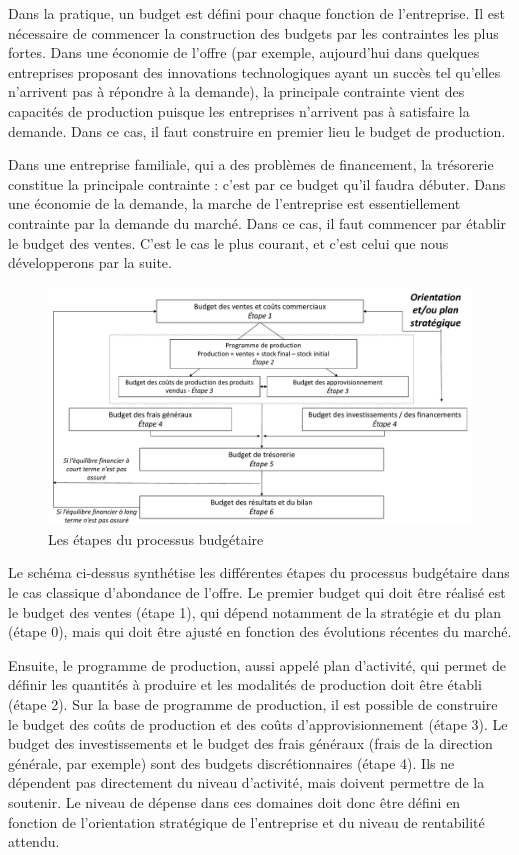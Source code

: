 \documentclass[oneside]{kaobook}
\begin{document}
Dans la pratique, un budget est défini pour chaque fonction de l'entreprise. Il est nécessaire de commencer la construction des budgets par les contraintes les plus fortes. Dans une économie de l'offre (par exemple, aujourd'hui dans quelques entreprises proposant des innovations technologiques ayant un succès tel qu'elles n'arrivent pas à répondre à la demande), la principale contrainte vient des capacités de production puisque les entreprises n'arrivent pas à satisfaire la demande. Dans ce cas, il faut construire en premier lieu le budget de production. 

Dans une entreprise familiale, qui a des problèmes de financement, la trésorerie constitue la principale contrainte : c'est par ce budget qu'il faudra débuter. Dans une économie de la demande, la marche de l'entreprise est essentiellement contrainte par la demande du marché. Dans ce cas, il faut commencer par établir le budget des ventes. C'est le cas le plus courant, et c'est celui que nous développerons par la suite.

\begin{figure}[H]

\includegraphics[width=1.2\textwidth]{./img/budget.pdf}
\caption{Les étapes du processus budgétaire}
\end{figure}

Le schéma ci-dessus synthétise les différentes étapes du processus budgétaire dans le cas classique d'abondance de l'offre. Le premier budget qui doit être réalisé est le budget des ventes (étape 1), qui dépend notamment de la stratégie et du plan (étape 0), mais qui doit être ajusté en fonction des évolutions récentes du marché.

Ensuite, le programme de production, aussi appelé plan d'activité, qui permet de définir les quantités à produire et les modalités de production doit être établi (étape 2). Sur la base de programme de production, il est possible de construire le budget des coûts de production et des coûts d'approvisionnement (étape 3). Le budget des investissements et le budget des frais généraux (frais de la direction générale, par exemple) sont des budgets discrétionnaires (étape 4). Ils ne dépendent pas directement du niveau d'activité, mais doivent permettre de la soutenir. Le niveau de dépense dans ces domaines doit donc être défini en fonction de l'orientation stratégique de l'entreprise et du niveau de rentabilité attendu.
\end{document}
